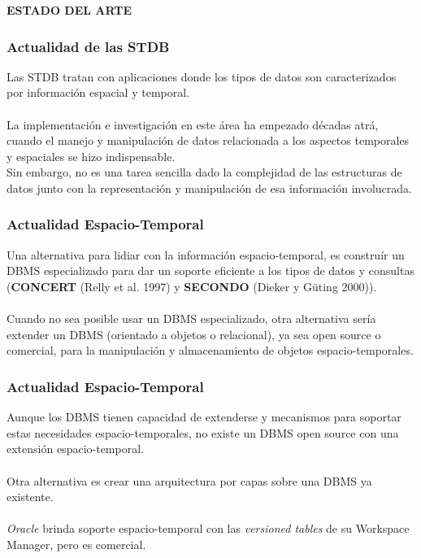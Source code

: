 \documentclass[12pt]{beamer}
\begin{document}
\begin{frame}
\begin{center}
\textbf{ESTADO DEL ARTE}
\end{center}
\end{frame}

\begin{frame}
\frametitle{Actualidad de las STDB}
Las STDB tratan con aplicaciones donde los tipos de datos son caracterizados por informaci\'on espacial y temporal.\\
\ \\
La implementaci\'on e investigaci\'on en este \'area ha empezado d\'ecadas atr\'a, cuando el manejo y manipulaci\'on de datos relacionada a los aspectos temporales y espaciales se hizo indispensable.
\ \\
Sin embargo, no es una tarea sencilla dado la complejidad de las estructuras de datos junto con la representaci\'on y manipulaci\'on de esa informaci\'on involucrada.
\end{frame}

\begin{frame}
\frametitle{Actualidad Espacio-Temporal}
Una alternativa para lidiar con la informaci\'on espacio-temporal, es constru\'ir un DBMS especializado para dar un soporte eficiente a los tipos de datos y consultas (\textbf{CONCERT} (Relly et al. 1997) y \textbf{SECONDO} (Dieker y G\"uting 2000)).\\
\ \\
Cuando no sea posible usar un DBMS especializado, otra alternativa ser\'ia extender un DBMS (orientado a objetos o relacional), ya sea open source o comercial, para la manipulaci\'on y almacenamiento de objetos espacio-temporales.
\end{frame}

\begin{frame}
\frametitle{Actualidad Espacio-Temporal}
Aunque los DBMS tienen capacidad de extenderse y mecanismos para soportar estas necesidades espacio-temporales, no existe un DBMS open source con una extensi\'on espacio-temporal.\\
\ \\
Otra alternativa es crear una arquitectura por capas sobre una DBMS ya existente.\\
\ \\
\textit{Oracle} brinda soporte espacio-temporal con las \textit{versioned tables} de su Workspace Manager, pero es comercial.
\end{frame}
\end{document}

